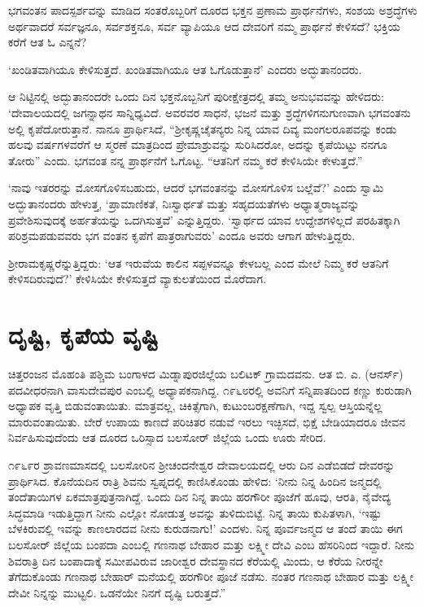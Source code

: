 ಭಗವಂತನ ಪಾದಸ್ಪರ್ಶವನ್ನು ಮಾಡಿದ ಸಂತರೊಬ್ಬರಿಗೆ ದೂರದ ಭಕ್ತನ ಪ್ರಣಾಮ ಪ್ರಾರ್ಥನೆಗಳು, ಸಂಶಯ ಅಶ್ರದ್ಧೆಗಳು ಅರ್ಥವಾದರೆ ಸರ್ವಜ್ಞನೂ, ಸರ್ವಶಕ್ತನೂ, ಸರ್ವ ವ್ಯಾಪಿಯೂ ಆದ ದೇವರಿಗೆ ನಮ್ಮ ಪ್ರಾರ್ಥನೆ ಕೇಳಿಸದೆ? ಭಕ್ತಿಯ ಕರೆಗೆ ಆತ ಓ ಎನ್ನನೆ?

‘ಖಂಡಿತವಾಗಿಯೂ ಕೇಳಿಸುತ್ತದೆ. ಖಂಡಿತವಾಗಿಯೂ ಆತ ಓಗೊಡುತ್ತಾನೆ’ ಎಂದರು ಅದ್ಭುತಾನಂದರು.

ಆ ನಿಟ್ಟಿನಲ್ಲಿ ಅದ್ಭುತಾನಂದರೇ ಒಂದು ದಿನ ಭಕ್ತನೊಬ್ಬನಿಗೆ ಪುರೀಕ್ಷೇತ್ರದಲ್ಲಿ ತಮ್ಮ ಅನುಭವವನ್ನು ಹೇಳಿದರು: ‘ದೇವಾಲಯದಲ್ಲಿ ಜಗನ್ನಾಥನ ಸಾನ್ನಿಧ್ಯವಿದೆ. ಅವರವರ ಸಾಧನೆ, ಭಜನೆ ಮತ್ತು ಶ್ರದ್ಧೆಗಳಿಗನುಗುಣವಾಗಿ ಭಗವಂತನು ಅಲ್ಲಿ ಕೃಪೆದೋರುತ್ತಾನೆ. ನಾನೂ ಪ್ರಾರ್ಥಿಸಿದೆ, “ಶ‍್ರೀಕೃಷ್ಣಚೈತನ್ಯರು ನಿನ್ನ ಯಾವ ದಿವ್ಯ ಮಂಗಲರೂಪವನ್ನು ಕಂಡು ಹಲವು ವರ್ಷಗಳವರೆಗೆ ಆ ಸ್ಮರಣೆ ಮಾತ್ರದಿಂದ ಪ್ರೇಮಾಶ್ರುವನ್ನು ಸುರಿಸಿದರೋ, ಅದನ್ನು ಕೃಪೆಯಿಟ್ಟು ನನಗೂ ತೋರು” ಎಂದು. ಭಗವಂತ ನನ್ನ ಪ್ರಾರ್ಥನೆಗೆ ಓಗೊಟ್ಟ. “ಆತನಿಗೆ ನಮ್ಮ ಕರೆ ಕೇಳಿಸಿಯೇ ಕೇಳುತ್ತದೆ.”

‘ನಾವು ಇತರರನ್ನು ಮೋಸಗೊಳಿಸಬಹುದು, ಆದರೆ ಭಗವಂತನನ್ನು ಮೋಸಗೊಳಿಸ ಬಲ್ಲೆವೆ?’ ಎಂದು ಸ್ವಾಮಿ ಅದ್ಭುತಾನಂದರು ಹೇಳುತ್ತ, ‘ಪ್ರಾಮಾಣಿಕತೆ, ನಿಃಸ್ವಾರ್ಥತೆ ಮತ್ತು ಸಹೃದಯತೆಗಳು ಅಧ್ಯಾತ್ಮರಾಜ್ಯವನ್ನು ಪ್ರವೇಶಿಸುವುದಕ್ಕೆ ಅರ್ಹತೆಯನ್ನು ಒದಗಿಸುತ್ತವೆ’ ಎನ್ನುತ್ತಿದ್ದರು. ‘ಸ್ವಾರ್ಥದ ಯಾವ ಉದ್ದೇಶಗಳಿಲ್ಲದೆ ಪರಹಿತಕ್ಕಾಗಿ ಪರಿಶ್ರಮಪಡುವವರು ಭಗ ವಂತನ ಕೃಪೆಗೆ ಪಾತ್ರರಾಗುವರು’ ಎಂದೂ ಅವರು ಆಗಾಗ ಹೇಳುತ್ತಿದ್ದರು.

ಶ‍್ರೀರಾಮಕೃಷ್ಣರೆನ್ನುತ್ತಿದ್ದರು: ‘ಆತ ಇರುವೆಯ ಕಾಲಿನ ಸಪ್ಪಳವನ್ನೂ ಕೇಳಬಲ್ಲ ಎಂದ ಮೇಲೆ ನಿಮ್ಮ ಕರೆ ಆತನಿಗೆ ಕೇಳಿಸದಿರುವುದೆ?’ ಕೇಳಿಸಿಯೇ ಕೇಳಿಸುತ್ತದೆ ವ್ಯಾಕುಲತೆಯಿಂದ ಮೊರೆದಾಗ.


\section{ದೃಷ್ಟಿ, ಕೃಪೆಯ ವೃಷ್ಟಿ}

ಚಿತ್ತರಂಜನ ಮೊಹಂತಿ ಪಶ್ಚಿಮ ಬಂಗಾಳದ ಮಿಡ್ನಾಪುರಜಿಲ್ಲೆಯ ಬಲಿಟಕ್ ಗ್ರಾಮದವನು. ಆತ ಬಿ. ಎ. (ಆನರ್ಸ್​) ಪದವೀಧರನಾಗಿ ವಾಸುದೇವಪುರ ಎಂಬಲ್ಲಿ ಅಧ್ಯಾಪಕನಾಗಿದ್ದ. ೧೯೬೮ರಲ್ಲಿ ಅವನಿಗೆ ಸನ್ನಿಪಾತದಿಂದ ಕಣ್ಣು ಕುರುಡಾಗಿ ಅಧ್ಯಾಪಕ ವೃತ್ತಿ ಬಿಡುವಂತಾಯಿತು. ಮಾತ್ರವಲ್ಲ, ಚಿಕಿತ್ಸೆಗಾಗಿ, ಕುಟುಂಬರಕ್ಷಣೆಗಾಗಿ, ಇದ್ದ ಸ್ವಲ್ಪ ಆಸ್ತಿಯನ್ನೆಲ್ಲ ಮಾರುವಂತಾಯಿತು. ಬೇರೆ ಉಪಾಯ ಕಾಣದೆ ಪರಿಚಿತರ ನಡುವೆ ಇರಲು ಇಚ್ಛಿಸದೆ, ಭಿಕ್ಷೆ ಬೇಡಿಯಾದರೂ ಜೀವನ ನಿರ್ವಹಿಸುವುದೆಂದು ಆತ ದೂರದ ಒರಿಸ್ಸಾದ ಬಲಸೋರ್ ಜಿಲ್ಲೆಯ ಒಂದು ಊರು ಸೇರಿದ.

೧೯೬೯ರ ಶ್ರಾವಣಮಾಸದಲ್ಲಿ ಬಲಸೋರಿನ ಶ‍್ರೀಚಂದನೇಶ್ವರ ದೇವಾಲಯದಲ್ಲಿ ಆರು ದಿನ ಎಡೆಬಿಡದೆ ದೇವರನ್ನು ಪ್ರಾರ್ಥಿಸಿದ. ಕೊನೆಯದಿನ ರಾತ್ರಿ ಶಿವನು ಸ್ವಪ್ನದಲ್ಲಿ ಕಾಣಿಸಿಕೊಂಡು ಹೇಳಿದ: ‘ನೀನು ನಿನ್ನ ಹಿಂದಿನ ಜನ್ಮದಲ್ಲಿ ತಂದೆತಾಯಿಗಳ ಏಕಮಾತ್ರಪುತ್ರನಾಗಿದ್ದೆ. ಒಂದು ದಿನ ನಿನ್ನ ತಾಯಿ ಹರಗೌರೀ ಪೂಜೆಗೆ ಹೂವು, ಆರತಿ, ನೈವೇದ್ಯ ಸಿದ್ಧಮಾಡಿ ಇಡುತ್ತಿದ್ದಾಗ ನೀನು ಎಲ್ಲೋ ನೋಡುತ್ತ ಅವನ್ನು ತುಳಿದುಬಿಟ್ಟೆ. ನಿನ್ನ ತಾಯಿ ಕುಪಿತಳಾಗಿ, ‘ಇಷ್ಟು ಬೆಳಕಿರುವಲ್ಲಿ ಇವನ್ನು ಕಾಣಲಾರದವ ನೀನು ಕುರುಡನಾಗು!’ ಎಂದಳು. ನಿನ್ನ ಪೂರ್ವಜನ್ಮದ ಆ ತಂದೆ ತಾಯಿ ಈಗ ಬಲಸೋರ್ ಜಿಲ್ಲೆಯ ಬಂಪದಾ ಎಂಬಲ್ಲಿ ಗಣನಾಥ ಬೇಹಾರ ಮತ್ತು ಲಕ್ಷ್ಮೀ ದೇವಿ ಎಂಬ ಹೆಸರಿನಿಂದ ಇದ್ದಾರೆ. ನೀನು ಶಿವರಾತ್ರಿ ದಿನ ಬಂಪಾದಾಕ್ಕೆ ಸಮೀಪವಿರುವ ಜಾರೀಶ್ವರ ದೇವಸ್ಥಾನದ ಕೆರೆಯಲ್ಲಿ ಮಿಂದು, ಆ ಕೆರೆಯ ನೀರನ್ನೇ ತೆಗೆದುಕೊಂಡು ಗಣನಾಥ ಬೇಹಾರ್ ಮನೆಯಲ್ಲಿ ಹರಗೌರೀ ಪೂಜೆ ನಡೆಸು. ನಂತರ ಗಣನಾಥ ಬೇಹಾರ ಮತ್ತು ಲಕ್ಷ್ಮೀ ದೇವೀ ನಿನ್ನನ್ನು ಮುಟ್ಟಲಿ. ಒಡನೆಯೇ ನಿನಗೆ ದೃಷ್ಟಿ ಬರುತ್ತದೆ.”


